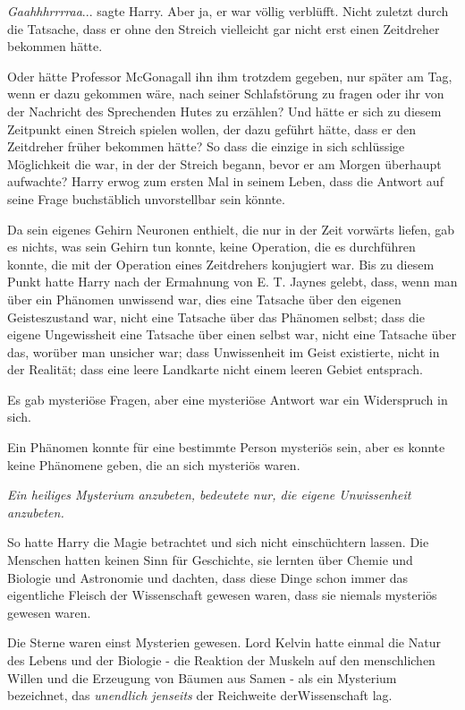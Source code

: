 \glqq \emph{Gaahhhrrrraa}...\grqq{} sagte Harry. Aber ja, er war völlig
verblüfft. Nicht zuletzt durch die Tatsache, dass er ohne den Streich vielleicht
gar nicht erst einen Zeitdreher bekommen hätte.

Oder hätte Professor McGonagall ihn ihm trotzdem gegeben, nur später am Tag,
wenn er dazu gekommen wäre, nach seiner Schlafstörung zu fragen oder ihr von der
Nachricht des Sprechenden Hutes zu erzählen? Und hätte er sich zu diesem
Zeitpunkt einen Streich spielen wollen, der dazu geführt hätte, dass er den
Zeitdreher früher bekommen hätte? So dass die einzige in sich schlüssige
Möglichkeit die war, in der der Streich begann, bevor er am Morgen überhaupt
aufwachte? Harry erwog zum ersten Mal in seinem Leben, dass die Antwort auf
seine Frage buchstäblich unvorstellbar sein könnte.

Da sein eigenes Gehirn Neuronen enthielt, die nur in der Zeit vorwärts liefen,
gab es nichts, was sein Gehirn tun konnte, keine Operation, die es durchführen
konnte, die mit der Operation eines Zeitdrehers konjugiert war. Bis zu diesem
Punkt hatte Harry nach der Ermahnung von E. T. Jaynes gelebt, dass, wenn man
über ein Phänomen unwissend war, dies eine Tatsache über den eigenen
Geisteszustand war, nicht eine Tatsache über das Phänomen selbst; dass die
eigene Ungewissheit eine Tatsache über einen selbst war, nicht eine Tatsache
über das, worüber man unsicher war; dass Unwissenheit im Geist existierte, nicht
in der Realität; dass eine leere Landkarte nicht einem leeren Gebiet entsprach.

Es gab mysteriöse Fragen, aber eine mysteriöse Antwort war ein Widerspruch in
sich.

Ein Phänomen konnte für eine bestimmte Person mysteriös sein, aber es konnte
keine Phänomene geben, die an sich mysteriös waren.

\emph{Ein heiliges Mysterium anzubeten, bedeutete nur, die eigene Unwissenheit
anzubeten.}

So hatte Harry die Magie betrachtet und sich nicht einschüchtern lassen. Die
Menschen hatten keinen Sinn für Geschichte, sie lernten über Chemie und Biologie
und Astronomie und dachten, dass diese Dinge schon immer das eigentliche Fleisch
der Wissenschaft gewesen waren, dass sie niemals mysteriös gewesen waren.

Die Sterne waren einst Mysterien gewesen. Lord Kelvin hatte einmal die Natur des
Lebens und der Biologie - die Reaktion der Muskeln auf den menschlichen Willen
und die Erzeugung von Bäumen aus Samen - als ein Mysterium bezeichnet, das\emph{
\glqq unendlich jenseits\grqq{} } der Reichweite derWissenschaft lag.

